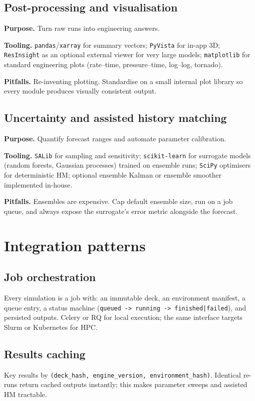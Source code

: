 \documentclass[11pt,a4paper]{article}
\begin{document}
\subsection{Post-processing and visualisation}
\textbf{Purpose.} Turn raw runs into engineering answers.

\textbf{Tooling.} \texttt{pandas}/\texttt{xarray} for summary vectors;
\texttt{PyVista} for in-app 3D; \texttt{ResInsight} as an optional external
viewer for very large models; \texttt{matplotlib} for standard engineering
plots (rate--time, pressure--time, log--log, tornado).

\textbf{Pitfalls.} Re-inventing plotting. Standardise on a small internal plot
library so every module produces visually consistent output.

\subsection{Uncertainty and assisted history matching}
\textbf{Purpose.} Quantify forecast ranges and automate parameter calibration.

\textbf{Tooling.} \texttt{SALib} for sampling and sensitivity; \texttt{scikit-learn}
for surrogate models (random forests, Gaussian processes) trained on ensemble
runs; \texttt{SciPy} optimisers for deterministic HM; optional ensemble Kalman
or ensemble smoother implemented in-house.

\textbf{Pitfalls.} Ensembles are expensive. Cap default ensemble size, run on a
job queue, and always expose the surrogate's error metric alongside the
forecast.

\section{Integration patterns}

\subsection{Job orchestration}
Every simulation is a job with: an immutable deck, an environment manifest, a
queue entry, a status machine (\texttt{queued -> running -> finished|failed}),
and persisted outputs. Celery or RQ for local execution; the same interface
targets Slurm or Kubernetes for HPC.

\subsection{Results caching}
Key results by \texttt{(deck\_hash, engine\_version, environment\_hash)}. Identical
re-runs return cached outputs instantly; this makes parameter sweeps and
assisted HM tractable.
\end{document}
